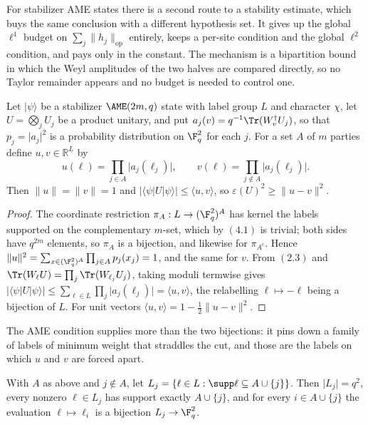 For stabilizer AME states there is a second route to a stability estimate,
which buys the same conclusion with a different hypothesis set.  It gives
up the global \(\ell^1\) budget on \(\sum_j\lVert h_j\rVert_{\mathrm{op}}\)
entirely, keeps a per-site condition and the global \(\ell^2\) condition,
and pays only in the constant.  The mechanism is a bipartition bound in
which the Weyl amplitudes of the two halves are compared directly, so no
Taylor remainder appears and no budget is needed to control one.

\begin{proposition}\label{prop:half-splitting}
Let \(\lvert\psi\rangle\) be a stabilizer \(\AME(2m,q)\) state with label
group \(L\) and character \(\chi\), let \(U=\bigotimes_jU_j\) be a product
unitary, and put \(a_j(v)=q^{-1}\Tr(W_v^\dagger U_j)\), so that
\(p_j=\lvert a_j\rvert^2\) is a probability distribution on \(\F_q^2\) for
each \(j\).  For a set \(A\) of \(m\) parties define \(u,v\in\mathbb R^L\)
by
\[
 u(\ell)=\prod_{j\in A}\lvert a_j(\ell_j)\rvert,\qquad
 v(\ell)=\prod_{j\notin A}\lvert a_j(\ell_j)\rvert .
\]
Then \(\lVert u\rVert=\lVert v\rVert=1\) and
\(\lvert\langle\psi\rvert U\lvert\psi\rangle\rvert\leq\langle u,v\rangle\),
so \(\varepsilon(U)^2\geq\lVert u-v\rVert^2\).
\end{proposition}

\begin{proof}
The coordinate restriction \(\pi_A:L\to(\F_q^2)^A\) has kernel the labels
supported on the complementary \(m\)-set, which by \((4.1)\) is trivial;
both sides have \(q^{2m}\) elements, so \(\pi_A\) is a bijection, and
likewise for \(\pi_{A^c}\).  Hence
\(\lVert u\rVert^2=\sum_{x\in(\F_q^2)^A}\prod_{j\in A}p_j(x_j)=1\), and the
same for \(v\).  From \((2.3)\) and
\(\Tr(W_\ell U)=\prod_j\Tr(W_{\ell_j}U_j)\), taking moduli termwise gives
\(\lvert\langle\psi\rvert U\lvert\psi\rangle\rvert
\leq\sum_{\ell\in L}\prod_j\lvert a_j(\ell_j)\rvert=\langle u,v\rangle\),
the relabelling \(\ell\mapsto-\ell\) being a bijection of \(L\).  For unit
vectors \(\langle u,v\rangle=1-\frac12\lVert u-v\rVert^2\).
\end{proof}

The AME condition supplies more than the two bijections: it pins down a
family of labels of minimum weight that straddles the cut, and those are
the labels on which \(u\) and \(v\) are forced apart.

\begin{lemma}\label{lem:cut-transversal}
With \(A\) as above and \(j\notin A\), let
\(L_j=\{\ell\in L:\supp\ell\subseteq A\cup\{j\}\}\).  Then
\(\lvert L_j\rvert=q^2\), every nonzero \(\ell\in L_j\) has support exactly
\(A\cup\{j\}\), and for every \(i\in A\cup\{j\}\) the evaluation
\(\ell\mapsto\ell_i\) is a bijection \(L_j\to\F_q^2\).
\end{lemma}

